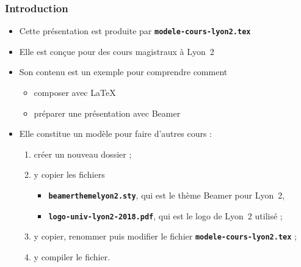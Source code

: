 \documentclass[aspectratio=169,10pt,t]{beamer}
\begin{document}
\begin{frame}%
  \frametitle{Introduction}


  \begin{itemize}
  \item Cette présentation est produite par \texttt{\textbf{modele-cours-lyon2.tex}}
  \item Elle est conçue pour des cours magistraux à Lyon~2
  \item Son contenu est un exemple pour comprendre comment

    \begin{itemize}
    \item composer avec \LaTeX{}
    \item préparer une présentation avec Beamer
    \end{itemize}

  \end{itemize}

  \pause


  \begin{itemize}
  \item Elle constitue un modèle pour faire d'autres cours :
    
    \begin{enumerate}
    \item créer un nouveau dossier ;
    \item y copier les fichiers 
      
      \begin{itemize}
      \item \texttt{\textbf{beamerthemelyon2.sty}}, qui est le thème Beamer pour Lyon~2,
      \item \texttt{\textbf{logo-univ-lyon2-2018.pdf}}, qui est le logo de Lyon~2 utilisé ;
      \end{itemize}
      
    \item y copier, renommer puis modifier le fichier \texttt{\textbf{modele-cours-lyon2.tex}} ;
    \item y compiler le fichier.
    \end{enumerate}
  \end{itemize}

  \pause

\end{frame}
\end{document}
